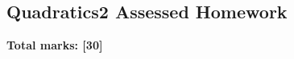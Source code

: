 \documentclass[../c1]{subfiles}
\begin{document}
\subsection*{Quadratics2 Assessed Homework}
\thispagestyle{fancy}



\begin{flushright}
\textbf{Total marks: [30]}
\end{flushright}
\end{document}
